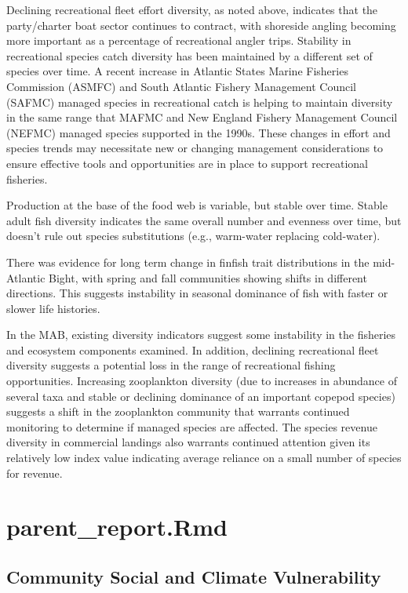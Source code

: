 \documentclass[
  10pt,
]{article}
\begin{document}
Declining recreational fleet effort diversity, as noted above, indicates that the party/charter boat sector continues to contract, with shoreside angling becoming more important as a percentage of recreational angler trips. Stability in recreational species catch diversity has been maintained by a different set of species over time. A recent increase in Atlantic States Marine Fisheries Commission (ASMFC) and South Atlantic Fishery Management Council (SAFMC) managed species in recreational catch is helping to maintain diversity in the same range that MAFMC and New England Fishery Management Council (NEFMC) managed species supported in the 1990s. These changes in effort and species trends may necessitate new or changing management considerations to ensure effective tools and opportunities are in place to support recreational fisheries.

Production at the base of the food web is variable, but stable over time. Stable adult fish diversity indicates the same overall number and evenness over time, but doesn't rule out species substitutions (e.g., warm-water replacing cold-water).

There was evidence for long term change in finfish trait distributions in the mid-Atlantic Bight, with spring and fall communities showing shifts in different directions. This suggests instability in seasonal dominance of fish with faster or slower life histories.

In the MAB, existing diversity indicators suggest some instability in the fisheries and ecosystem components examined. In addition, declining recreational fleet diversity suggests a potential loss in the range of recreational fishing opportunities. Increasing zooplankton diversity (due to increases in abundance of several taxa and stable or declining dominance of an important copepod species) suggests a shift in the zooplankton community that warrants continued monitoring to determine if managed species are affected. The species revenue diversity in commercial landings also warrants continued attention given its relatively low index value indicating average reliance on a small number of species for revenue.

\section{parent\_report.Rmd}\label{parent_report.rmd-4}

\subsection{Community Social and Climate Vulnerability}\label{community-social-and-climate-vulnerability}
\end{document}
